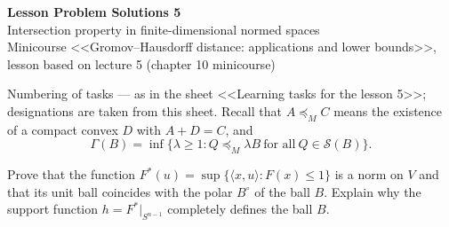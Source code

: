 \documentclass[a4paper,12pt]{report}
\begin{document}
\begin{center}
{\Large\bfseries Lesson Problem Solutions \textup{5}}\\[2mm]
{\large Intersection property in finite-dimensional normed spaces}\\[2mm]
{\small Minicourse <<Gromov--Hausdorff distance: applications and lower bounds>>, lesson based on lecture \textup{5} (chapter \textup{10} minicourse)}
\end{center}

Numbering of tasks --- as in the sheet <<Learning tasks for the lesson \textup{5}>>; designations are taken from this sheet. Recall that $A\preceq_M C$ means the existence of a compact convex $D$ with $A+D=C$, and
\begin{equation}\label{eq:gamma}
\Gamma(B)=\inf\bigl\{\lambda\ge1: Q\preceq_M\lambda B\ \text{for all}\ Q\in\mathcal S(B)\bigr\}.
\end{equation}
\begin{task}
Prove that the function $F^*(u)=\sup\{\langle x,u\rangle: F(x)\le1\}$ is a norm on $V$ and that its unit ball coincides with the polar $B^\circ$ of the ball $B$. Explain why the support function $h=F^*|_{S^{n-1}}$ completely defines the ball $B$.

\end{task}
\end{document}
